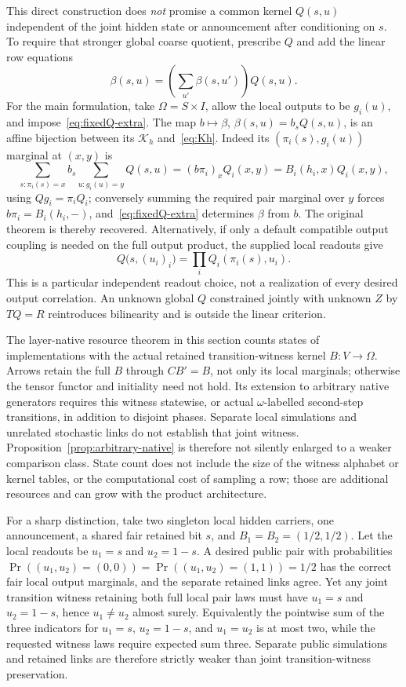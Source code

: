 \documentclass[11pt]{article}
\newcommand{\Kcal}{\mathcal K}
\theoremstyle{remark}
\begin{document}
This direct construction does \emph{not} promise a common kernel $Q(s,u)$ independent of the joint hidden state or announcement after conditioning on $s$. To require that stronger global coarse quotient, prescribe $Q$ and add the linear row equations
\begin{equation}\label{eq:fixedQ-extra}
 \beta(s,u)=\left(\sum_{u'}\beta(s,u')\right)Q(s,u).
\end{equation}
For the main formulation, take $\Omega=S\times I$, allow the local outputs to be $g_i(u)$, and impose~\eqref{eq:fixedQ-extra}. The map $b\mapsto\beta$, $\beta(s,u)=b_sQ(s,u)$, is an affine bijection between its $\Kcal_h$ and~\eqref{eq:Kh}. Indeed its $(\pi_i(s),g_i(u))$ marginal at $(x,y)$ is
\[
 \sum_{s:\pi_i(s)=x}b_s\sum_{u:g_i(u)=y}Q(s,u)
 =(b\pi_i)_xQ_i(x,y)=B_i(h_i,x)Q_i(x,y),
\]
using $Qg_i=\pi_iQ_i$; conversely summing the required pair marginal over $y$ forces $b\pi_i=B_i(h_i,-)$, and~\eqref{eq:fixedQ-extra} determines $\beta$ from $b$. The original theorem is thereby recovered. Alternatively, if only a default compatible output coupling is needed on the full output product, the supplied local readouts give
\[
 Q\bigl(s,(u_i)_i\bigr)=\prod_i Q_i(\pi_i(s),u_i).
\]
This is a particular independent readout choice, not a realization of every desired output correlation. An unknown global $Q$ constrained jointly with unknown $Z$ by $TQ=R$ reintroduces bilinearity and is outside the linear criterion.

The layer-native resource theorem in this section counts states of implementations with the actual retained transition-witness kernel $B:V\to\Omega$. Arrows retain the full $B$ through $CB'=B$, not only its local marginals; otherwise the tensor functor and initiality need not hold. Its extension to arbitrary native generators requires this witness statewise, or actual $\omega$-labelled second-step transitions, in addition to disjoint phases. Separate local simulations and unrelated stochastic links do not establish that joint witness. Proposition~\ref{prop:arbitrary-native} is therefore not silently enlarged to a weaker comparison class. State count does not include the size of the witness alphabet or kernel tables, or the computational cost of sampling a row; those are additional resources and can grow with the product architecture.

For a sharp distinction, take two singleton local hidden carriers, one announcement, a shared fair retained bit $s$, and $B_1=B_2=(1/2,1/2)$. Let the local readouts be $u_1=s$ and $u_2=1-s$. A desired public pair with probabilities $\Pr((u_1,u_2)=(0,0))=\Pr((u_1,u_2)=(1,1))=1/2$ has the correct fair local output marginals, and the separate retained links agree. Yet any joint transition witness retaining both full local pair laws must have $u_1=s$ and $u_2=1-s$, hence $u_1\ne u_2$ almost surely. Equivalently the pointwise sum of the three indicators for $u_1=s$, $u_2=1-s$, and $u_1=u_2$ is at most two, while the requested witness laws require expected sum three. Separate public simulations and retained links are therefore strictly weaker than joint transition-witness preservation.
\end{document}
